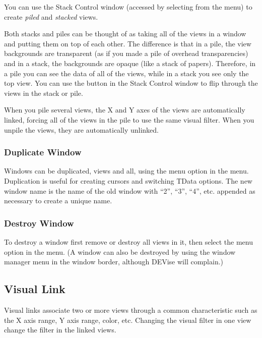You can use the Stack Control window (accessed by selecting  from the  menu) to create {\em piled} and {\em stacked}
views.

Both stacks and piles can be thought of as taking all of the views in a window
and putting them on top of each other.  The difference is that in a pile,
the view backgrounds are transparent (as if you made a pile of overhead
transparencies) and in a stack, the backgrounds are opaque (like a stack
of papers).  Therefore, in a pile you can see the data of all of the views,
while in a stack you see only the top view.  You can use the 
button in the Stack Control window to flip through the views in the
stack or pile.

When you pile several views, the X and Y axes of the views are automatically
linked, forcing all of the views in the pile to use the same visual filter.
When you unpile the views, they are automatically unlinked.

\subsubsection{Duplicate Window}

Windows can be duplicated, views and all, using the  menu option
in the  menu. Duplication is useful for creating cursors and
switching TData options. The new window name is the name of the old window with
``2'', ``3'', ``4'', etc. appended as necessary to create a unique name.

\subsubsection{Destroy Window}

To destroy a window first remove or destroy all views in it, then select the 
menu option in the  menu. (A window can also be destroyed by
using the window manager menu in the window border, although DEVise will
complain.)


\subsection{Visual Link}

Visual links associate two or more views through a common characteristic such as
the X axis range, Y axis range, color, etc. Changing the visual filter in one
view change the filter in the linked views.

